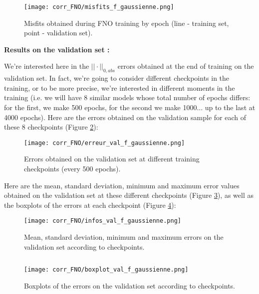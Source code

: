 \begin{figure}[H]
	\centering
	\texttt{[image: corr\_FNO/misfits\_f\_gaussienne.png]}
	\caption{Misfits obtained during FNO training by epoch (line - training set, point - validation set).}
	\label{misfits_f_gaussienne}
\end{figure}

\textbf{Results on the validation set :}

We're interested here in the $||\cdot||_{0,abs}$ errors obtained at the end of training on the validation set. In fact, we're going to consider different checkpoints in the training, or to be more precise, we're interested in different moments in the training (i.e. we will have 8 similar models whose total number of epochs differs: for the first, we make 500 epochs, for the second we make 1000... up to the last at 4000 epochs). Here are the errors obtained on the validation sample for each of these 8 checkpoints (Figure \ref{erreur_val_f_gaussienne}):

\begin{figure}[H]
	\centering
	\texttt{[image: corr\_FNO/erreur\_val\_f\_gaussienne.png]}
	\caption{Errors obtained on the validation set at different training checkpoints (every 500 epochs).}
	\label{erreur_val_f_gaussienne}
\end{figure} 

Here are the mean, standard deviation, minimum and maximum error values obtained on the validation set at these different checkpoints (Figure \ref{infos_val_f_gaussienne}), as well as the boxplots of the errors at each checkpoint (Figure \ref{boxplot_val_f_gaussienne}):

\begin{minipage}{0.48\linewidth}
	\begin{figure}[H]
		\centering
		\texttt{[image: corr\_FNO/infos\_val\_f\_gaussienne.png]}
		\caption{Mean, standard deviation, minimum and maximum errors on the validation set according to checkpoints.}
		\label{infos_val_f_gaussienne}
	\end{figure} 
\end{minipage} $\qquad$
\begin{minipage}{0.48\linewidth}
	\begin{figure}[H]
		\centering
		\texttt{[image: corr\_FNO/boxplot\_val\_f\_gaussienne.png]}
		\caption{Boxplots of the errors on the validation set according to checkpoints.}
		\label{boxplot_val_f_gaussienne}
	\end{figure} 
\end{minipage}

